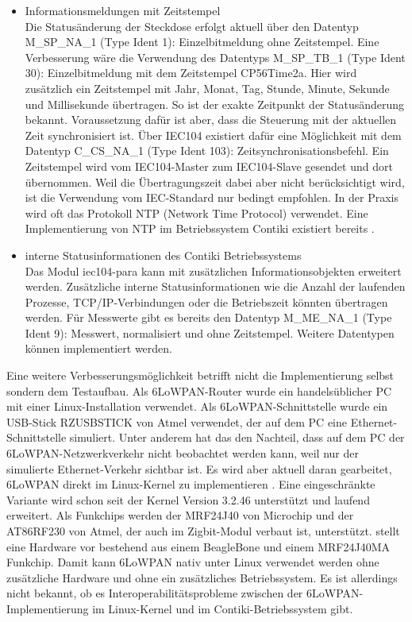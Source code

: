 \begin{itemize}
	\itemsep 0pt
	\item Informationsmeldungen mit Zeitstempel
	\\Die Statusänderung der Steckdose erfolgt aktuell über den Datentyp M\_SP\_NA\_1 (Type Ident 1): Einzelbitmeldung ohne Zeitstempel. Eine Verbesserung wäre die Verwendung des Datentyps M\_SP\_TB\_1 (Type Ident 30): Einzelbitmeldung mit dem Zeitstempel CP56Time2a. Hier wird zusätzlich ein Zeitstempel mit Jahr, Monat, Tag, Stunde, Minute, Sekunde und Millisekunde übertragen. So ist der exakte Zeitpunkt der Statusänderung bekannt. Voraussetzung dafür ist aber, dass die Steuerung mit der aktuellen Zeit synchronisiert ist. Über IEC104 existiert dafür eine Möglichkeit mit dem Datentyp C\_CS\_NA\_1 (Type Ident 103): Zeitsynchronisationsbefehl. Ein Zeitstempel wird vom IEC104-Master zum IEC104-Slave gesendet und dort übernommen. Weil die Übertragungszeit dabei aber nicht berücksichtigt wird, ist die Verwendung vom IEC-Standard nur bedingt empfohlen. In der Praxis wird oft das Protokoll NTP (Network Time Protocol) verwendet. Eine Implementierung von NTP im Betriebssystem Contiki existiert bereits \cite{Contiki-syslog}.
	\item interne Statusinformationen des Contiki Betriebssystems
	\\Das Modul iec104-para kann mit zusätzlichen Informationsobjekten erweitert werden. Zusätzliche interne Statusinformationen wie die Anzahl der laufenden Prozesse, TCP/IP-Verbindungen oder die Betriebszeit könnten übertragen werden. Für Messwerte gibt es bereits den Datentyp M\_ME\_NA\_1 (Type Ident 9): Messwert, normalisiert und ohne Zeitstempel. Weitere Datentypen können implementiert werden.
\end{itemize}

Eine weitere Verbesserungsmöglichkeit betrifft nicht die Implementierung selbst sondern dem Testaufbau. Als 6LoWPAN-Router wurde ein handelsüblicher PC mit einer Linux-Installation verwendet. Als 6LoWPAN-Schnittstelle wurde ein USB-Stick RZUSBSTICK von Atmel verwendet, der auf dem PC eine Ethernet-Schnittstelle simuliert. Unter anderem hat das den Nachteil, dass auf dem PC der 6LoWPAN-Netzwerkverkehr nicht beobachtet werden kann, weil nur der simulierte Ethernet-Verkehr sichtbar ist. Es wird aber aktuell daran gearbeitet, 6LoWPAN direkt im Linux-Kernel zu implementieren \citep{Ott2012}. Eine eingeschränkte Variante wird schon seit der Kernel Version 3.2.46 unterstützt und laufend erweitert. Als Funkchips werden der MRF24J40 von Microchip und der AT86RF230 von Atmel, der auch im Zigbit-Modul verbaut ist, unterstützt. \citeauthor{Ott2012} stellt eine Hardware vor bestehend aus einem BeagleBone und einem MRF24J40MA Funkchip. Damit kann 6LoWPAN nativ unter Linux verwendet werden ohne zusätzliche Hardware und ohne ein zusätzliches Betriebssystem. Es ist allerdings nicht bekannt, ob es Interoperabilitätsprobleme zwischen der 6LoWPAN-Implementierung im Linux-Kernel und im Contiki-Betriebssystem gibt.


